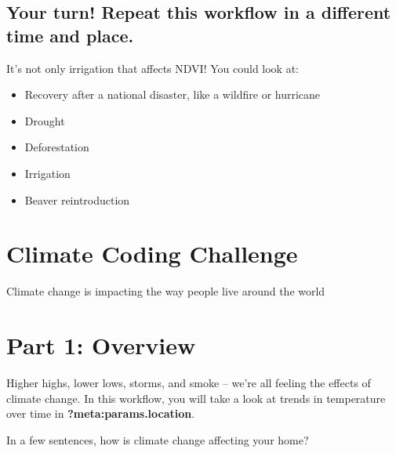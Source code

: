 \documentclass[
  letterpaper,
  DIV=11,
  numbers=noendperiod,
  oneside]{scrreprt}
\providecommand{\tightlist}{%
  \setlength{\itemsep}{0pt}\setlength{\parskip}{0pt}}
\begin{document}
\section{Your turn! Repeat this workflow in a different time and
place.}\label{your-turn-repeat-this-workflow-in-a-different-time-and-place.}

It's not only irrigation that affects NDVI! You could look at:

\begin{itemize}
\tightlist
\item
  Recovery after a national disaster, like a wildfire or hurricane
\item
  Drought
\item
  Deforestation
\item
  Irrigation
\item
  Beaver reintroduction
\end{itemize}


\chapter{Climate Coding Challenge}\label{climate-coding-challenge}

Climate change is impacting the way people live around the world

\hfill\break


\chapter{Part 1: Overview}\label{part-1-overview}

Higher highs, lower lows, storms, and smoke -- we're all feeling the
effects of climate change. In this workflow, you will take a look at
trends in temperature over time in \textbf{?meta:params.location}.

\begin{tcolorbox}[enhanced jigsaw, colbacktitle=quarto-callout-color!10!white, opacityback=0, bottomtitle=1mm, toptitle=1mm, bottomrule=.15mm, left=2mm, colframe=quarto-callout-color-frame, leftrule=.75mm, opacitybacktitle=0.6, colback=white, rightrule=.15mm, toprule=.15mm, breakable, titlerule=0mm, title=\textcolor{quarto-callout-color}{\faInfo}\hspace{0.5em}{Conversation Starter}, coltitle=black, arc=.35mm]

In a few sentences, how is climate change affecting your home?

\end{tcolorbox}
\end{document}

